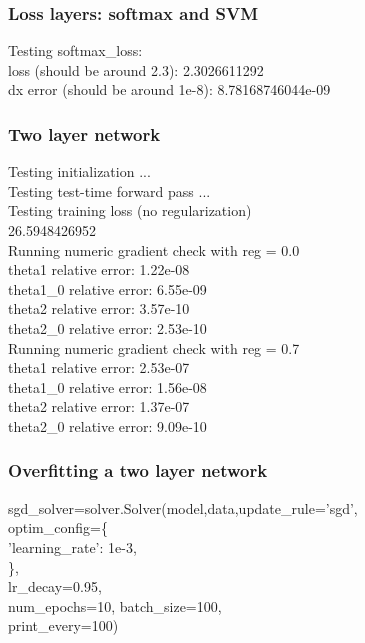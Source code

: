 \documentclass{article}
\begin{document}
\subsubsection*{Loss layers: softmax and SVM}
{\footnotesize
Testing softmax\_loss:\\
loss (should be around 2.3):  2.3026611292\\
dx error (should be around 1e-8):  8.78168746044e-09\\
}

\subsubsection{Two layer network}
{\footnotesize
Testing initialization ... \\
Testing test-time forward pass ... \\
Testing training loss (no regularization)\\
26.5948426952\\
Running numeric gradient check with reg =  0.0\\
theta1 relative error: 1.22e-08\\
theta1\_0 relative error: 6.55e-09\\
theta2 relative error: 3.57e-10\\
theta2\_0 relative error: 2.53e-10\\
Running numeric gradient check with reg =  0.7\\
theta1 relative error: 2.53e-07\\
theta1\_0 relative error: 1.56e-08\\
theta2 relative error: 1.37e-07\\
theta2\_0 relative error: 9.09e-10\\
}

\subsubsection{Overfitting a two layer network}
{\footnotesize
sgd\_solver=solver.Solver(model,data,update\_rule='sgd',\\
\qquad                  optim\_config=\{\\
\quad                    'learning\_rate': 1e-3,\\
\quad                  \},\\
\quad                  lr\_decay=0.95,\\
\quad                  num\_epochs=10, batch\_size=100,\\
\quad                  print\_every=100)\\
\quad}\\
\end{document}
